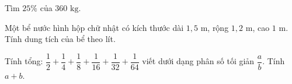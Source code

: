 \begin{ex} %
Tìm $25\%$ của $360\text{ kg}$.
\end{ex}

\begin{ex} %
Một bể nước hình hộp chữ nhật có kích thước dài $1{,}5\text{ m}$, rộng $1{,}2\text{ m}$, cao $1\text{ m}$. Tính dung tích của bể theo lít.
\end{ex}

\begin{ex} %
Tính tổng: $\dfrac{1}{2} + \dfrac{1}{4} + \dfrac{1}{8} + \dfrac{1}{16} + \dfrac{1}{32} + \dfrac{1}{64}$ viết dưới dạng phân số tối giản $\dfrac{a}{b}$. Tính $a + b$.
\end{ex}
